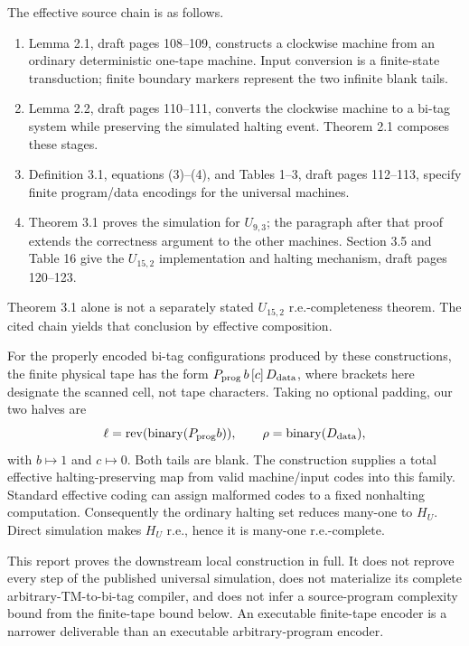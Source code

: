 \documentclass[11pt,letterpaper]{article}
\theoremstyle{definition}
\theoremstyle{remark}
\newcommand{\rev}{\operatorname{rev}}
\begin{document}
The effective source chain is as follows.
\begin{enumerate}
\item Lemma 2.1, draft pages 108--109, constructs a clockwise machine from an ordinary deterministic one-tape machine. Input conversion is a finite-state transduction; finite boundary markers represent the two infinite blank tails.
\item Lemma 2.2, draft pages 110--111, converts the clockwise machine to a bi-tag system while preserving the simulated halting event. Theorem 2.1 composes these stages.
\item Definition 3.1, equations (3)--(4), and Tables 1--3, draft pages 112--113, specify finite program/data encodings for the universal machines.
\item Theorem 3.1 proves the simulation for $U_{9,3}$; the paragraph after that proof extends the correctness argument to the other machines. Section 3.5 and Table 16 give the $U_{15,2}$ implementation and halting mechanism, draft pages 120--123.
\end{enumerate}
Theorem 3.1 alone is not a separately stated $U_{15,2}$ r.e.-completeness theorem. The cited chain yields that conclusion by effective composition.

For the properly encoded bi-tag configurations produced by these constructions, the finite physical tape has the form $P_{\rm prog}\,b\,[c]\,D_{\rm data}$, where brackets here designate the scanned cell, not tape characters. Taking no optional padding, our two halves are
\[
 \ell=\rev(\operatorname{binary}(P_{\rm prog}b)),\qquad
 \rho=\operatorname{binary}(D_{\rm data}),
\]
with $b\mapsto1$ and $c\mapsto0$. Both tails are blank. The construction supplies a total effective halting-preserving map from valid machine/input codes into this family. Standard effective coding can assign malformed codes to a fixed nonhalting computation. Consequently the ordinary halting set reduces many-one to $H_U$. Direct simulation makes $H_U$ r.e., hence it is many-one r.e.-complete.

This report proves the downstream local construction in full. It does not reprove every step of the published universal simulation, does not materialize its complete arbitrary-TM-to-bi-tag compiler, and does not infer a source-program complexity bound from the finite-tape bound below. An executable finite-tape encoder is a narrower deliverable than an executable arbitrary-program encoder.
\end{document}
